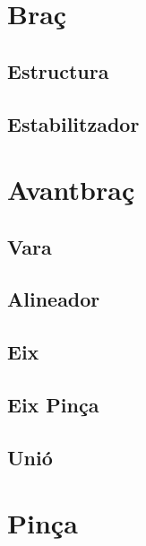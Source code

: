 \documentclass[a4paper, 10pt]{article}
\begin{document}
\newpage
\section{Braç}

\subsection{Estructura}

\subsection{Estabilitzador}

\newpage
\section{Avantbraç}

\subsection{Vara}

\subsection{Alineador}

\subsection{Eix}

\subsection{Eix Pinça}

\subsection{Unió}

\newpage
\section{Pinça}
\end{document}
